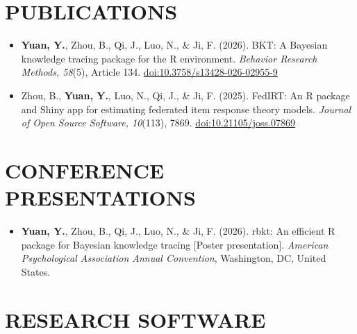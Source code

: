 \documentclass[a4paper,12pt]{article}
\begin{document}
\hfill
\section{\textbf{PUBLICATIONS}}
\begin{minipage}[t]{\linewidth}
\begin{itemize}[nosep,after=\strut, leftmargin=1em, itemsep=2pt]
    \item \textbf{Yuan, Y.}, Zhou, B., Qi, J., Luo, N., \& Ji, F. (2026). BKT: A Bayesian knowledge tracing package for the R environment. \textit{Behavior Research Methods, 58}(5), Article 134. \href{https://doi.org/10.3758/s13428-026-02955-9}{doi:10.3758/s13428-026-02955-9}
    \item Zhou, B., \textbf{Yuan, Y.}, Luo, N., Qi, J., \& Ji, F. (2025). FedIRT: An R package and Shiny app for estimating federated item response theory models. \textit{Journal of Open Source Software, 10}(113), 7869. \href{https://doi.org/10.21105/joss.07869}{doi:10.21105/joss.07869}
\end{itemize}
\end{minipage}

\hfill
\section{\textbf{CONFERENCE PRESENTATIONS}}

\begin{minipage}[t]{\linewidth}
\begin{itemize}[nosep,after=\strut, leftmargin=1em, itemsep=2pt]

    \item \textbf{Yuan, Y.}, Zhou, B., Qi, J., Luo, N., \& Ji, F. (2026).
    rbkt: An efficient R package for Bayesian knowledge tracing
    [Poster presentation].
    \textit{American Psychological Association Annual Convention},
    Washington, DC, United States.

\end{itemize}
\end{minipage}

\hfill
\section{\textbf{RESEARCH SOFTWARE}}
\end{document}
